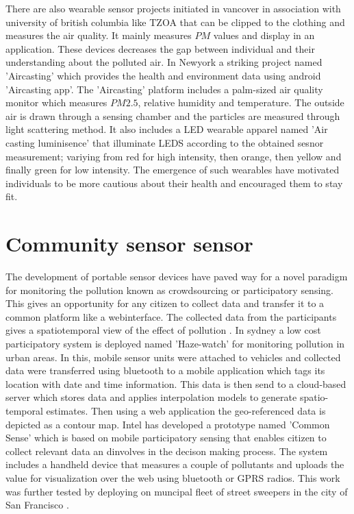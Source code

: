  There are also wearable sensor projects initiated in vancover in association with university of british columbia like TZOA \cite{tzoa} that can be clipped to the clothing and measures the air quality. It mainly measures $PM$ values and display in an application. These devices decreases the gap between individual and their understanding about the polluted air. In Newyork a striking project named 'Aircasting'\cite{aircasting} which provides the health and environment data using android 'Aircasting app'. The 'Aircasting'\cite{Han2010} platform includes a palm-sized air quality monitor which measures $PM2.5$, relative humidity and temperature. The outside air is drawn through a sensing chamber and the particles are measured through light scattering method. It also includes a LED wearable apparel named 'Air casting luminisence'\cite{Luminescence} that illuminate LEDS according to the obtained sesnor measurement; variying from red for high intensity, then orange, then yellow and finally green for low intensity. The emergence of such wearables have motivated individuals to be more cautious about their health and encouraged them to stay fit.



\section{Community sensor sensor}

The development of portable sensor devices have paved way for a novel paradigm for monitoring the pollution known as crowdsourcing or participatory sensing. This gives an opportunity for any citizen to collect data and transfer it to a common platform like a webinterface. The collected data  from the participants gives a spatiotemporal view of the effect of pollution \cite{Kanhere2013}. In sydney a low cost participatory system is deployed named 'Haze-watch' \cite{Sivaraman2013} for monitoring pollution in urban areas. In this, mobile sensor units were attached to vehicles and collected data were transferred using bluetooth to a mobile application which tags its location with date and time information. This data is then send to a cloud-based server which stores data and applies interpolation models \cite{Liao2006} to generate spatio-temporal estimates. Then using a web application the geo-referenced data is depicted as a contour map. Intel has developed a prototype named 'Common Sense' \cite{Dutta2009} which is based on mobile participatory sensing \cite{Abdelzaher2007} that enables citizen to collect relevant data an dinvolves in the decison making process. The system includes a handheld device that measures a couple of pollutants and uploads the value for visualization over the web using bluetooth or GPRS radios. This work was further tested by deploying on muncipal fleet of street sweepers in the city of San Francisco \cite{Aoki2008}.

